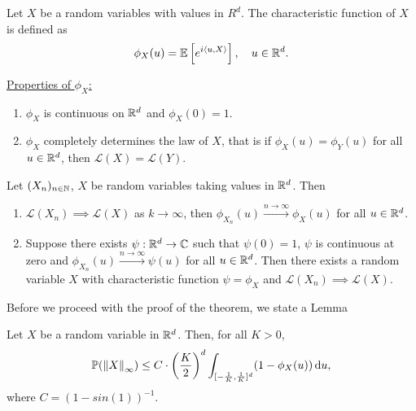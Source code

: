 \documentclass{article}
\begin{document}
\begin{boxdef}\label{def: charateristic function}
Let $ X$ be a random variables with values in $ R^{d}$. The characteristic function of $ X$ is defined as 
\[
	\phi_{X}(u) = \mathbb{E}\left[ e^{i\langle u, X\rangle} \right], \quad u\in \mathbb{R}^{d}.
\]
\end{boxdef}
\underline{Properties of $ \phi_{X}$:}
\begin{enumerate}
	\item $ \phi_{X}$ is continuous on $ \mathbb{R}^{d}$ and $ \phi_{X}(0)=1$.
	\item $ \phi_{X}$ completely determines the law of $ X$, that is if $ \phi_{X}(u) = \phi_{Y}(u)$ for all $ u\in \mathbb{R}^{d}$, then $  \mathcal{L}(X) = \mathcal{L}(Y)$.
\end{enumerate}

 \begin{theorem}\label{thm: levy conv thm}
Let $ (X_{n})_{n\in \mathbb{N}}$, $ X$ be random variables taking values in $ \mathbb{R}^{d}$. Then 
\begin{enumerate}
	\item $ \mathcal{L}(X_{n})\implies \mathcal{L}(X)$  as $ k\to \infty$, then $ \phi_{X_{n}}(u) \stackrel{n\to \infty}{\longrightarrow}\phi_{X}(u)$ for all $ u\in \mathbb{R}^{d}$. 
	\item Suppose there exists $ \psi:\mathbb{R}^{d}\to \mathbb{C}$ such that $ \psi(0) = 1$, $ \psi$ is continuous at zero and  $ \phi_{X_{n}}(u) \stackrel{n\to \infty}{\longrightarrow}\psi(u)$ for all $ u\in \mathbb{R}^{d}$. Then there exists a random variable $ X$ with characteristic function $ \psi = \phi_{X}$ and $ \mathcal{L}(X_{n})\implies \mathcal{L}(X)$. 
 
\end{enumerate}

\end{theorem}

Before we proceed with the proof of the theorem, we state a Lemma
\begin{boxlemma}\label{lemma: characteristic function bound}
Let $ X$ be a random variable in $ \mathbb{R}^{d}$. Then, for all $ K>0$, 
\[
	\mathbb{P}(\left\lVert X\right\rVert_{\infty})\leq C\cdot \left( \frac{K}{2} \right)^{d} \displaystyle\int_{[-\frac{1}{K}, \frac{1}{K}]^{d}} (1-\phi_{X}(u))  \operatorname{d}\!  u, 
\]
where $ C = (1-sin(1))^{-1}$.
\end{boxlemma}
\end{document}
